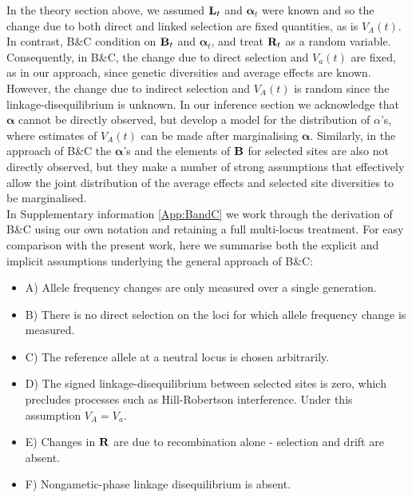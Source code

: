 \documentclass[12pt]{article}
\begin{document}
\begin{bibunit}
In the theory section above, we assumed ${\bf L}_t$ and $\boldsymbol{\alpha}_t$ were known and so the change due to both direct and linked selection are fixed quantities, as is $V_A(t)$. In contrast, B\&C condition on ${\bf B}_t$ and $\boldsymbol{\alpha}_t$, and treat ${\bf R}_t$ as a random variable. Consequently, in B\&C, the change due to direct selection and $V_a(t)$ are fixed, as in our approach, since genetic diversities and average effects are known. However, the change due to indirect selection and $V_A(t)$ is random since the linkage-disequilibrium is unknown.  In our inference section we acknowledge that $\boldsymbol{\alpha}$ cannot be directly observed, but develop a model for the distribution of $\alpha$'s, where estimates of $V_A(t)$ can be made after marginalising $\boldsymbol{\alpha}$. Similarly, in the approach of B\&C the $\boldsymbol{\alpha}$'s and the elements of ${\bf B}$ for selected sites are also not directly observed, but they make a number of strong assumptions that effectively allow the joint distribution of the average effects and selected site diversities to be marginalised.\\

In Supplementary information \ref{App:BandC} we work through the derivation of B\&C using our own notation and retaining a full multi-locus treatment. For easy comparison with the present work, here we summarise both the explicit and implicit  assumptions underlying the general approach of B\&C:
 
\begin{itemize}

\item A) Allele frequency changes are only measured over a single generation.

\item B) There is no direct selection on the loci for which allele frequency change is measured.

\item C) The reference allele at a neutral locus is chosen arbitrarily.

\item D) The signed linkage-disequilibrium between selected sites is zero, which precludes processes such as Hill-Robertson interference. Under this assumption $V_A=V_a$.

\item E) Changes in ${\bf R}$ are due to recombination alone - selection and drift are absent. 

\item F) Nongametic-phase linkage disequilibrium is absent.  


\end{itemize}
\end{bibunit}
\end{document}
